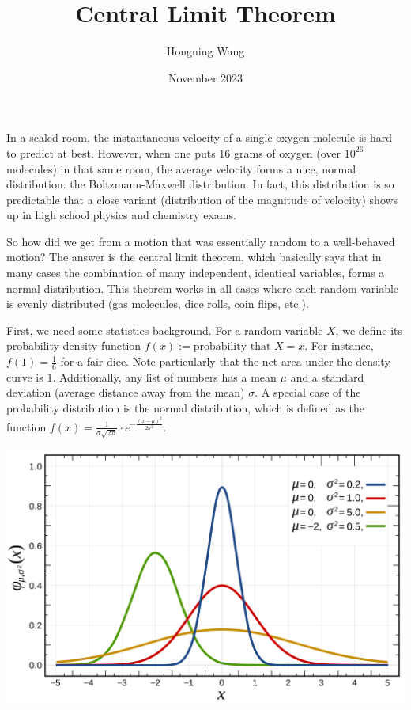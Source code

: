 \documentclass{article}
\title{Central Limit Theorem}
\author{Hongning Wang}
\date{November 2023}
\begin{document}
\maketitle

In a sealed room, the instantaneous velocity of a single oxygen molecule is hard to predict at best. However, when one puts $16$ grams of oxygen (over $10^{26}$ molecules) in that same room, the average velocity forms a nice, normal distribution: the Boltzmann-Maxwell distribution. In fact, this distribution is so predictable that a close  variant (distribution of the magnitude of velocity) shows up in high school physics and chemistry exams.

So how did we get from a motion that was essentially random to a well-behaved motion? The answer is the central limit theorem, which basically says that in many cases the combination of many independent, identical variables, forms a normal distribution. This theorem works in all cases where each random variable is evenly distributed (gas molecules, dice rolls, coin flips, etc.).

First, we need some statistics background. For a random variable $X$, we define its probability density function $f(x) := \text{probability that } X = x$. For instance, $f(1) = \frac{1}{6}$ for a fair dice. Note particularly that the net area under the density curve is $1$. Additionally, any list of numbers has a mean $\mu$ and a standard deviation (average distance away from the mean) $\sigma$. A special case of the probability distribution is the normal distribution, which is defined as the function $f(x) = \frac{1}{\sigma \sqrt{2\pi}} \cdot e^{-\frac{(x - \mu)^2}{2\sigma^2}}$.

\begin{center}
    \includegraphics[scale=0.1]{nov23/images/normal_distrib.png}
\end{center}
\end{document}
